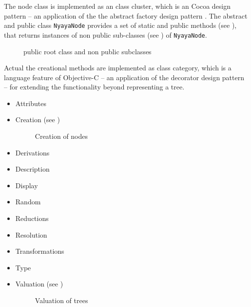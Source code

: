 The node class is implemented as an class cluster, 
which is an Cocoa design pattern \cite[p.282ff]{Buck:2009:CDP:1803585}
– an application of the the abstract factory design pattern \cite[p.87ff]{GAMMAETAL}.
The abstract and public class \verb+NyayaNode+ 
provides a set of static and public methods (see ),
that returns instances of non public sub-classes (see )
of \verb+NyayaNode+.

\begin{figure}[htbp]
\begin{center}
\caption{public root class and non public subclasses}
\label{fig:NyayaNodeCluster}
\end{center}
\end{figure}



Actual the creational methods are implemented as class category, 
which is a language feature of Objective-C \cite[p.225ff]{Kochan:2009:PO:1538451}
– an application of the decorator design pattern \cite[p.175ff]{GAMMAETAL} –
for extending the functionality beyond representing a tree. 

\begin{itemize}
\item Attributes
\item Creation  (see )

\begin{figure}[htbp]
\begin{center}
\caption{Creation of nodes}
\label{fig:NyayaNodeCreation}
\end{center}
\end{figure}

\item Derivations
\item Description
\item Display  %
\item Random
\item Reductions
\item Resolution
\item Transformations
\item Type
\item Valuation (see )

\begin{figure}[htbp]
\begin{center}
\caption{Valuation of trees}
\label{fig:NyayaNodeValuation}
\end{center}
\end{figure}

\end{itemize}





